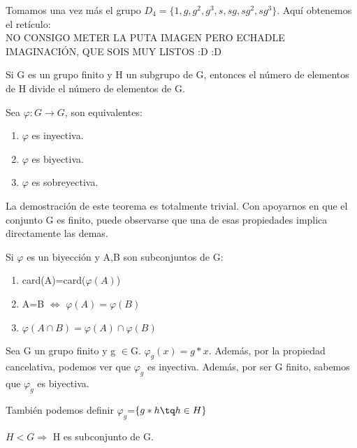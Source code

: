 \documentclass[a4paper,10pt]{apuntes}
\begin{document}
  \begin{example}
   Tomamos una vez más el grupo $D_{4}=\{1,g,g^{2}, g^{3}, s, sg, sg^{2}, sg^{3}\}$. Aquí obtenemos el retículo:\\
   NO CONSIGO METER LA PUTA IMAGEN PERO ECHADLE IMAGINACIÓN, QUE SOIS MUY LISTOS :D :D
  \end{example}

  \begin{theorem}
   Si G es un grupo finito y H un subgrupo de G, entonces el número de elementos de H divide el número de elementos de G.
  \end{theorem}
  \begin{lemma}
   Sea $\varphi: G\rightarrow G$, son equivalentes:
   \begin{enumerate}
    \item $\varphi$  es inyectiva.
    \item $\varphi$  es biyectiva.
    \item $\varphi$  es sobreyectiva.
   \end{enumerate}
  \end{lemma}
  La demostración de este teorema es totalmente trivial. Con apoyarnos en que el conjunto G es finito, puede observarse que una de
  esas propiedades implica directamente las demas.
  
  \begin{lemma}
   Si $\varphi$  es un biyección y A,B son subconjuntos de G:
   \begin{enumerate}
    \item card(A)=card($\varphi(A)$)
    \item A=B $\Leftrightarrow$  $\varphi(A)=\varphi(B)$
    \item $\varphi(A\cap B)=\varphi(A)\cap\varphi(B)$
   \end{enumerate}
  \end{lemma}
  
  \begin{lemma}
   Sea G un grupo finito y g $\in$G. $\varphi_{g}(x)=g*x$. Además, por la propiedad cancelativa, podemos ver que $\varphi_{g}$ es inyectiva.
   Además, por ser G finito, sabemos que $\varphi_{g}$  es biyectiva.
  \end{lemma}
  También podemos definir $\varphi_{g}$=$\{g*h\tq h\in H\}$
  \begin{lemma}
   $H<G\Rightarrow$  H es subconjunto de G.
  \end{lemma}
  
\end{document}
